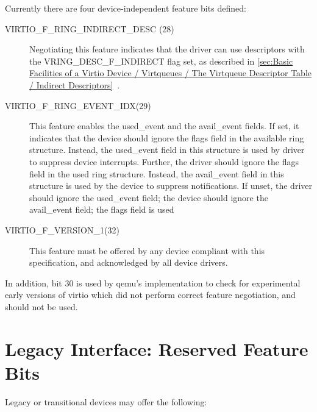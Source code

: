 Currently there are four device-independent feature bits defined:

\begin{description}
  \item[VIRTIO_F_RING_INDIRECT_DESC (28)] Negotiating this feature indicates
  that the driver can use descriptors with the VRING_DESC_F_INDIRECT
  flag set, as described in \ref{sec:Basic Facilities of a Virtio Device / Virtqueues / The Virtqueue Descriptor Table / Indirect Descriptors}~.

  \item[VIRTIO_F_RING_EVENT_IDX(29)] This feature enables the used_event
  and the avail_event fields. If set, it indicates that the
  device should ignore the flags field in the available ring
  structure. Instead, the used_event field in this structure is
  used by driver to suppress device interrupts. Further, the
  driver should ignore the flags field in the used ring
  structure. Instead, the avail_event field in this structure is
  used by the device to suppress notifications. If unset, the
  driver should ignore the used_event field; the device should
  ignore the avail_event field; the flags field is used

  \item[VIRTIO_F_VERSION_1(32)] This feature must be offered by any device
  compliant with this specification, and acknowledged by all device
  drivers.
\end{description}

In addition, bit 30 is used by qemu's implementation to check for experimental
early versions of virtio which did not perform correct feature negotiation,
and should not be used.

\section{Legacy Interface: Reserved Feature Bits}\label{sec:Reserved Feature Bits / Legacy Interface: Reserved Feature Bits}

Legacy or transitional devices may offer the following:

